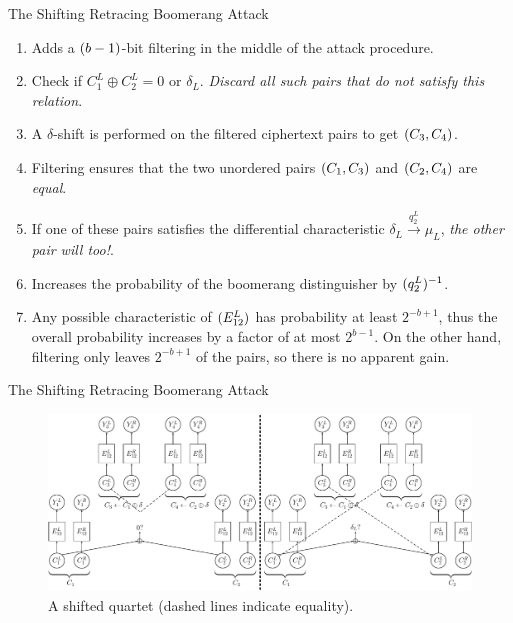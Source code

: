 \documentclass[notheorems]{beamer}
\theoremstyle{definition}
\theoremstyle{example}
\begin{document}
    \begin{frame}[<+->]{The Shifting Retracing Boomerang Attack}
        \begin{enumerate}
            \item Adds a \((b - 1)\)-bit filtering in the middle of the
            attack procedure.
            \item Check if \(C_1^L \oplus C_2^L = 0 \textrm{ or } \delta_L\).
            \emph{Discard all such pairs that do not satisfy this relation}.
            \item A \(\delta\)-shift is performed on the filtered ciphertext
            pairs to get \((C_3, C_4)\).
            \item Filtering ensures that the two unordered pairs \((C_1,
            C_3)\) and \((C_2, C_4)\) are \emph{equal}.
            \item If one of these pairs satisfies the differential
            characteristic \(\delta_L \xrightarrow{q_2^L} \mu_L\), \emph{the
            other pair will too!}.
            \item Increases the probability of the boomerang distinguisher by
            \((q_2^L)^{-1}\).
            \item Any possible characteristic of \((E_{12}^L)\) has
            probability at least \(2^{-b + 1}\), thus the overall probability
            increases by a factor of at most \(2^{b - 1}\). On the other hand,
            filtering only leaves \(2^{-b + 1}\) of the pairs, so there is no
            apparent gain.
        \end{enumerate}
    \end{frame}

    \begin{frame}{The Shifting Retracing Boomerang Attack}
        \begin{figure}
            \centering
            \includegraphics[width=\columnwidth]{images/shifting_boomerang.png}
            \caption{A shifted quartet (dashed lines indicate equality).}
        \end{figure}
    \end{frame}
\end{document}
